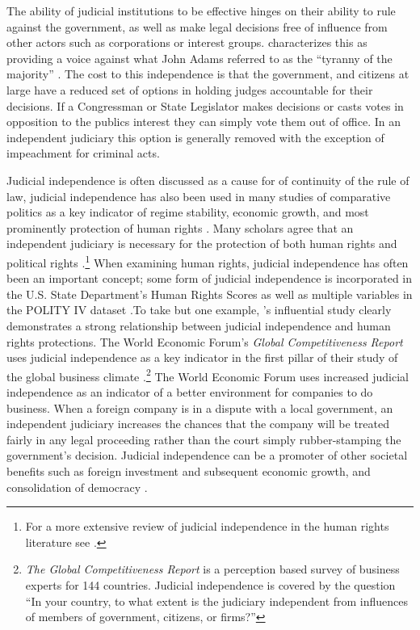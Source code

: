 \documentclass[12pt]{article}
\begin{document}
The ability of judicial institutions to be effective hinges on their ability to rule against the government, as well as make legal decisions free of influence from other actors such as corporations or interest groups.  \citet{Ferejohn2003} characterizes this as providing a voice against what John Adams referred to as the ``tyranny of the majority'' \citep{Adams1794}.  The cost to this independence is that the government, and citizens at large have a reduced set of options in holding judges accountable for their decisions.  If a Congressman or State Legislator makes decisions or casts votes in opposition to the publics interest they can simply vote them out of office.  In an independent judiciary this option is generally removed with the exception of impeachment for criminal acts.

Judicial independence is often discussed as a cause for of continuity of the rule of law, judicial independence has also been used in many studies of comparative politics as a key indicator of regime stability, economic growth, and most prominently protection of human rights \citep[1]{Linzer2014}.  Many scholars agree that an independent judiciary is necessary for the protection of both human rights and political rights \citep{Keith2002a,Keith2002b,Howard2004,Russell2001}.\footnote{For a more extensive review of judicial independence in the human rights literature see \citep[Footnote 1]{Keith2002b}.}  When examining human rights, judicial independence has often been an important concept; some form of judicial independence is incorporated in the U.S. State Department's Human Rights Scores as well as multiple variables in the POLITY IV dataset \citep{Cingranelli2008, Polity,Howard2004}.To take but one example, \citet{Keith2002b}'s influential study clearly demonstrates a strong relationship between judicial independence and human rights protections.  The World Economic Forum's \textit{Global Competitiveness Report} uses judicial independence as a key indicator in the first pillar of their study of the global business climate \citep{WEFGLR2014}.\footnote{\textit{The Global Competitiveness Report} is a perception based survey of business experts for 144 countries.  Judicial independence is covered by the question ``In your country, to what extent is the judiciary independent from influences of members of government, citizens, or firms?''}  The World Economic Forum uses increased judicial independence as an indicator of a better environment for companies to do business.  When a foreign company is in a dispute with a local government, an independent judiciary increases the chances that the company will be treated fairly in any legal proceeding rather than the court simply rubber-stamping the government's decision.  Judicial independence can be a promoter of other societal benefits such as foreign investment and subsequent economic growth, and consolidation of democracy \citep[9]{Rios2006}.  
\end{document}

